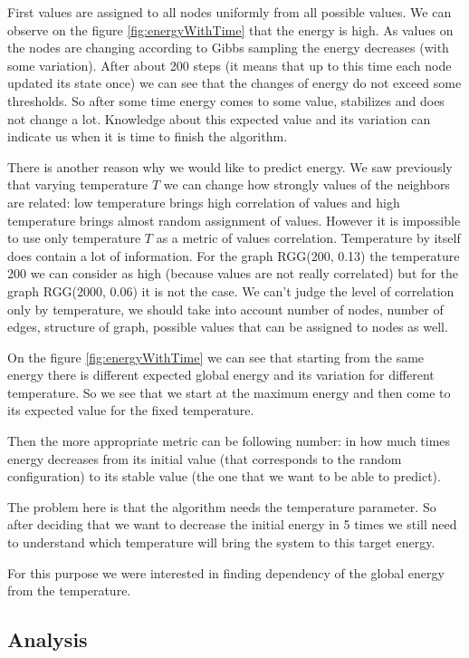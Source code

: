 \documentclass[12pt]{report}
\begin{document}
First values are assigned to all nodes uniformly from all possible values. We can observe on the figure \ref{fig:energyWithTime} that the energy is high. As values on the nodes are changing according to Gibbs sampling the energy decreases (with some variation). After about 200 steps (it means that up to this time each node updated its state once) we can see that the changes of energy do not exceed some thresholds. So after some time energy comes to some value, stabilizes and does not change a lot. Knowledge about this expected value and its variation can indicate us when it is time to finish the algorithm. 
 
 

There is another reason why we would like to predict energy.
We saw previously that varying temperature $T$ we can change how strongly values of the neighbors are related: low temperature brings high correlation of values and high temperature brings almost random assignment of values. However it is impossible to use only temperature $T$ as a metric of values correlation. Temperature by itself does contain a lot of information. For the graph RGG(200, 0.13) the temperature 200 we can consider as high (because values are not really correlated) but for the graph RGG(2000, 0.06) it is not the case. We can't judge the level of correlation only by temperature, we should take into account number of nodes, number of edges, structure of graph, possible values that can be assigned to nodes as well. 


On the figure \ref{fig:energyWithTime} we can see that starting from the same energy there is different expected global energy and its variation for different temperature. So we see that we start at the maximum energy and then come to its expected value for the fixed temperature.

Then the more appropriate metric can be following number: in how much times energy decreases from its initial value (that corresponds to the random configuration) to its stable value (the one that we want to be able to predict).

The problem here is that the algorithm needs the temperature parameter. So after deciding that we want to decrease the initial energy in 5 times we still need to understand which temperature will bring the system to this target energy.

For this purpose we were interested in finding dependency of the global energy from the temperature. 


\subsection{Analysis}
\end{document}
